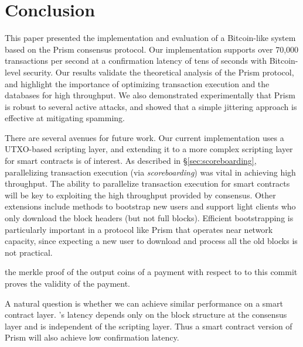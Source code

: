\chapter{Conclusion}
\label{sec:conclusion}

This paper presented the implementation and evaluation of a Bitcoin-like system based on the Prism consensus protocol. Our implementation supports over 70,000 transactions per second at a confirmation latency of tens of seconds with Bitcoin-level security. Our results validate the theoretical analysis of the Prism protocol, and highlight the importance of optimizing transaction execution and the databases for high throughput.   We also demonstrated experimentally that Prism is robust to several active attacks, and showed that a simple jittering approach is effective at mitigating spamming. 

There are several avenues for future work. Our current implementation uses a UTXO-based scripting layer, and extending it to a more complex scripting layer for smart contracts is of interest.  As described in \S\ref{sec:scoreboarding}, parallelizing transaction execution (via \textit{scoreboarding}) was vital in achieving high throughput. The ability to parallelize transaction execution for smart contracts will  be  key to exploiting the high throughput provided by \prism consensus. Other extensions include methods to bootstrap new users and support light clients who only download the block headers (but not full blocks). Efficient bootstrapping is particularly important in a protocol like Prism that operates near network capacity, since expecting a new user to download and process all the old blocks is not practical. 


the merkle proof of the output coins of a payment with respect to to this commit proves the validity of the payment. 

 A natural question is whether we can achieve similar performance on a smart contract layer. 
 \prism's latency depends only on the block structure at the consensus layer and is independent of the scripting layer. Thus a smart contract version of Prism will also achieve low confirmation latency. 

